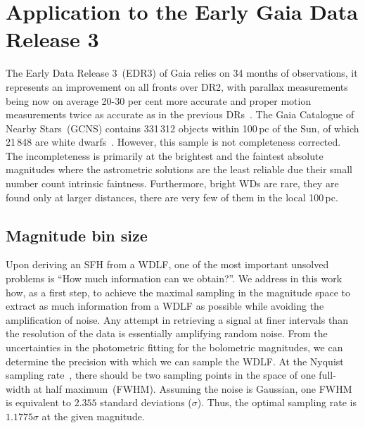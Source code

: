\documentclass[fleqn,usenatbib]{mnras}
\begin{document}
\section{Application to the Early Gaia Data Release 3}
The Early Data Release 3~(EDR3) of Gaia relies on 34 months of observations, it
represents an improvement on all fronts over DR2, with parallax measurements
being now on average 20-30 per cent more accurate and proper motion measurements
twice as accurate as in the previous
DRs~\citep{2021A&A...649A...1G, 2021A&A...649A...2L}. The Gaia Catalogue of
Nearby Stars~(GCNS) contains 331\,312 objects within 100\,pc of the Sun, of
which 21\,848 are white dwarfs~\citep{2021A&A...649A...6G}. However, this sample
is not completeness corrected. The incompleteness is primarily at the brightest
and the faintest absolute magnitudes where the astrometric solutions are the
least reliable due their small number count intrinsic faintness. Furthermore,
bright WDs are rare, they are found only at larger distances, there are very
few of them in the local 100\,pc.

\subsection{Magnitude bin size}
\label{sec:magnitude_bin_size}
Upon deriving an SFH from a WDLF, one of the most important unsolved problems
is ``How much information can we obtain?''. We address in this work how, as a
first step, to achieve the maximal sampling in the magnitude space to extract
as much information from a WDLF as possible while avoiding the amplification of
noise. Any attempt in retrieving a signal at finer intervals than the
resolution of the data is essentially amplifying random noise. From the
uncertainties in the photometric fitting for the bolometric magnitudes, we can
determine the precision with which we can sample the WDLF. At the Nyquist
sampling rate~\citep{1949IEEEP..37...10S}, there should be two sampling points
in the space of one full-width at half maximum~(FWHM). Assuming the noise is
Gaussian, one FWHM is equivalent to $2.355$ standard deviations ($\sigma$).
Thus, the optimal sampling rate is $1.1775\sigma$ at the given magnitude.
\end{document}
